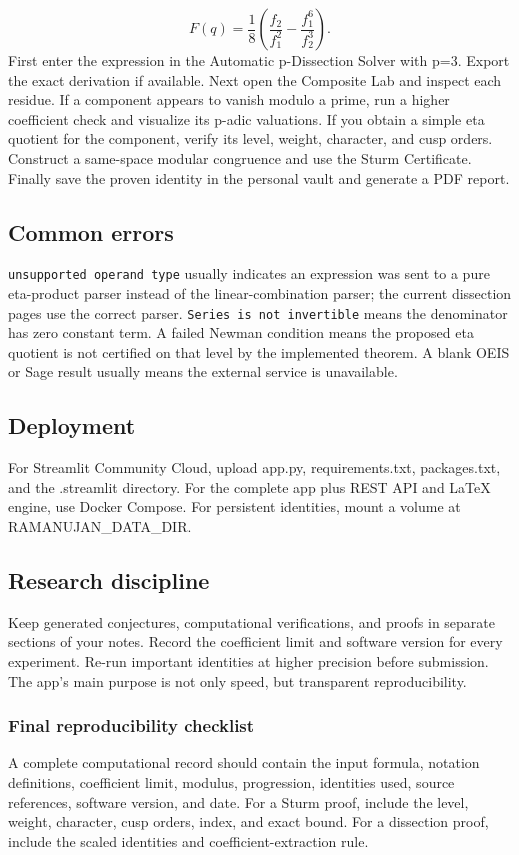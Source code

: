\documentclass[11pt]{article}
\begin{document}
\[
F(q)=\frac18\left(\frac{f_2}{f_1^2}-\frac{f_1^6}{f_2^3}\right).
\]
First enter the expression in the Automatic p-Dissection Solver with p=3. Export the exact derivation if available. Next open the Composite Lab and inspect each residue. If a component appears to vanish modulo a prime, run a higher coefficient check and visualize its p-adic valuations. If you obtain a simple eta quotient for the component, verify its level, weight, character, and cusp orders. Construct a same-space modular congruence and use the Sturm Certificate. Finally save the proven identity in the personal vault and generate a PDF report.

\subsection*{Common errors}
\texttt{unsupported operand type} usually indicates an expression was sent to a pure eta-product parser instead of the linear-combination parser; the current dissection pages use the correct parser. \texttt{Series is not invertible} means the denominator has zero constant term. A failed Newman condition means the proposed eta quotient is not certified on that level by the implemented theorem. A blank OEIS or Sage result usually means the external service is unavailable.

\subsection*{Deployment}
For Streamlit Community Cloud, upload app.py, requirements.txt, packages.txt, and the .streamlit directory. For the complete app plus REST API and LaTeX engine, use Docker Compose. For persistent identities, mount a volume at RAMANUJAN\_DATA\_DIR.

\subsection*{Research discipline}
Keep generated conjectures, computational verifications, and proofs in separate sections of your notes. Record the coefficient limit and software version for every experiment. Re-run important identities at higher precision before submission. The app's main purpose is not only speed, but transparent reproducibility.

\subsubsection*{Final reproducibility checklist}
A complete computational record should contain the input formula, notation definitions, coefficient limit, modulus, progression, identities used, source references, software version, and date. For a Sturm proof, include the level, weight, character, cusp orders, index, and exact bound. For a dissection proof, include the scaled identities and coefficient-extraction rule.
\end{document}
